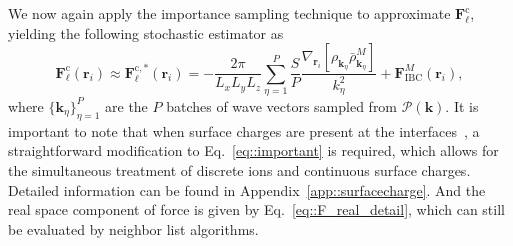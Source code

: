 We now again apply the importance sampling technique to approximate $\bm{F}_{\ell}^{\text{c}}$, yielding the following stochastic estimator as 
\begin{equation}\label{eq::important}
\bm{F}_{\ell}^{\text{c}}(\bm{r}_i)\approx \bm{F}_{\ell}^{\text{c},*}(\bm{r}_i)=-\frac{2\pi }{L_xL_yL_z}\sum_{\eta=1}^{P}\frac{S}{P}\frac{\nabla_{\bm{r}_i}\left[\rho_{\bm{k}_{\eta}}\bar{\rho}_{\bm{k}_{\eta}}^{M}\right]}{k_{\eta}^2}+\bm{F}_{\text{IBC}}^{M}(\bm{r}_i),
\end{equation}
where $\{\bm{k}_{\eta}\}_{\eta=1}^{P}$ are the $P$ batches of wave vectors sampled from $\mathscr{P}(\bm{k})$. 
It is important to note that when surface charges are present at the interfaces~\cite{spohr1997effect,yi2017note,yuan2021particle}, a straightforward modification to Eq.~\eqref{eq::important} is required, which allows for the simultaneous treatment of discrete ions and continuous surface charges.
Detailed information can be found in Appendix~\ref{app::surfacecharge}.
And the real space component of force is given by Eq.~\eqref{eq::F_real_detail}, which can still be evaluated by neighbor list algorithms.


